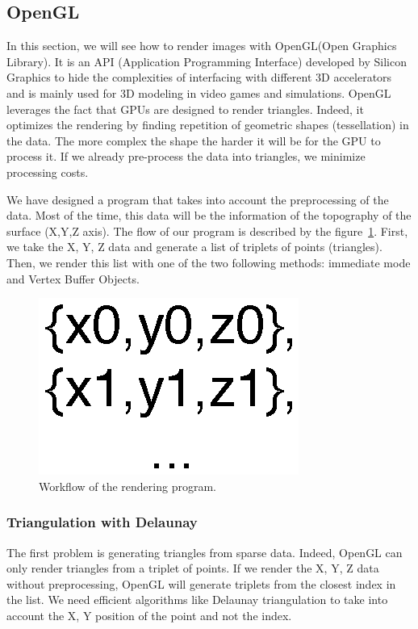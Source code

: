 \subsection{OpenGL}

In this section, we will see how to render images with OpenGL(Open Graphics Library). It is an API (Application Programming Interface) developed by Silicon Graphics to hide the complexities of interfacing with different 3D accelerators and is mainly used for 3D modeling in video games and simulations. OpenGL leverages the fact that GPUs are designed to render triangles. Indeed, it optimizes the rendering by finding repetition of geometric shapes (tessellation) in the data. The more complex the shape the harder it will be for the GPU to process it. If we already pre-process the data into triangles, we minimize processing costs. \cite{abobegpu}

We have designed a program that takes into account the preprocessing of the data. Most of the time, this data will be the information of the topography of the surface  (X,Y,Z axis). The flow of our program is described by the figure~\ref{fig:timelinerendering}. First, we take the X, Y, Z data and generate a list of triplets of points (triangles). Then, we render this list with one of the two following methods: immediate mode and Vertex Buffer Objects.

\begin{figure}[!ht]
  \centering
  \includegraphics[scale=0.40]{images/timelinerendering.eps}
    \caption{Workflow of the rendering program.}
  \label{fig:timelinerendering}
\end{figure}


\subsubsection{Triangulation with Delaunay}

The first problem is generating triangles from sparse data. Indeed, OpenGL can only render triangles from a triplet of points. If we render the X, Y, Z data without preprocessing, OpenGL will generate triplets from the closest index in the list. We need efficient algorithms like Delaunay triangulation to take into account the X, Y position of the point and not the index.

